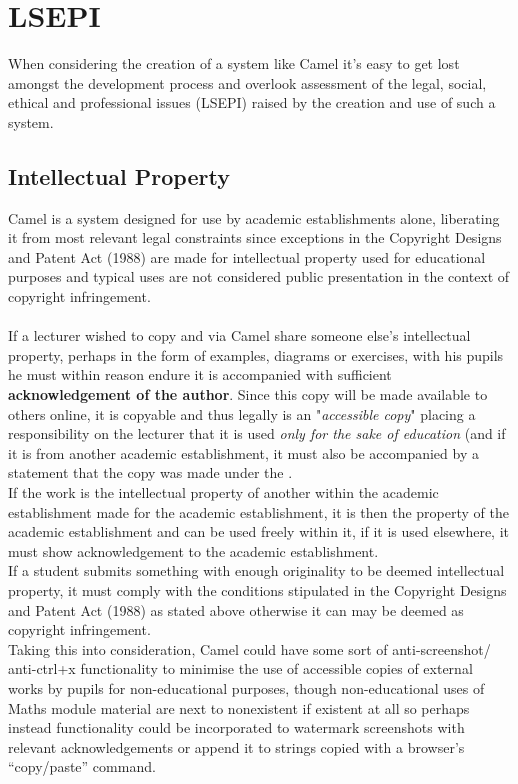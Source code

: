 \newpage
\section{LSEPI}
    When considering the creation of a system like Camel it’s easy to get lost amongst the development process and overlook assessment of the legal, social, ethical and professional issues (LSEPI) raised by the creation and use of such a system.
\subsection*{Intellectual Property}
Camel is a system designed for use by academic establishments alone, liberating it from most relevant legal constraints since exceptions in the Copyright Designs and Patent Act (1988) are made for intellectual property used for educational purposes and typical uses are not considered public presentation in the context of copyright infringement.
\\\\If a lecturer wished to copy and via Camel share someone else's intellectual property, perhaps in the form of examples, diagrams or exercises, with his pupils he must within reason endure it is accompanied with sufficient \textbf{acknowledgement of the author}. Since this copy will be made available to others online, it is copyable and thus legally is an "\textit{accessible copy}" placing a responsibility on the lecturer that it is used \emph{only for the sake of education} (and if it is from another academic establishment, it must also be accompanied by a statement that the copy was made under the \cite[(Pt 1, Ch 3, §31B)]{CDaPA}.
\\If the work is the intellectual property of another within the academic establishment made for the academic establishment, it is then the property of the academic establishment and can be used freely within it, if it is used elsewhere, it must show acknowledgement to the academic establishment.
\\If a student submits something with enough originality to be deemed intellectual property, it must comply with the conditions stipulated in the Copyright Designs and Patent Act (1988) as stated above otherwise it can may be deemed as copyright infringement.
\\Taking this into consideration, Camel could have some sort of anti-screenshot/ anti-ctrl+x functionality to minimise the use of accessible copies of external works by pupils for non-educational purposes, though non-educational uses of Maths module material are next to nonexistent if existent at all so perhaps instead functionality could be incorporated to watermark screenshots with relevant acknowledgements or append it to strings copied with a browser’s “copy/paste” command.
